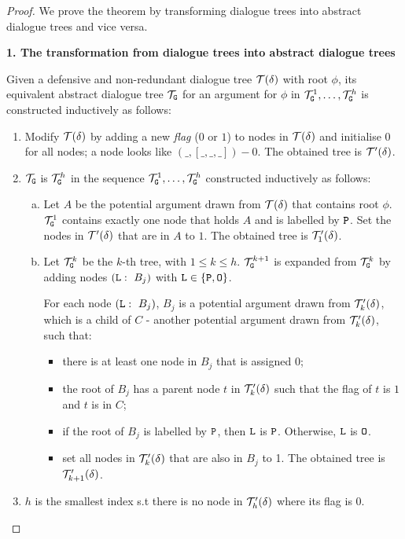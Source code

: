 \begin{proof}
We prove the theorem by transforming dialogue trees into abstract dialogue trees and vice versa.

\textbf{1. The transformation from dialogue trees into abstract dialogue trees}

Given a defensive and non-redundant dialogue tree $\mathcal{T}(\delta)$ with root $\phi$, its equivalent abstract dialogue tree $\mathcal{T}_{\texttt{\textup{G}}}$ for an argument for $\phi$ in $\mathcal{T}_{\texttt{\textup{G}}}^{1}, \ldots, \mathcal{T}_{\texttt{\textup{G}}}^{h}$ is constructed inductively as follows:

\begin{enumerate}
    \item Modify $\mathcal{T}(\delta)$ by adding a new \emph{flag} ($0$ or $1$) to  nodes in $\mathcal{T}(\delta)$ and initialise $0$ for all nodes; a node looks like $(\_, [\_, \_, \_])-0$. The obtained tree is $\mathcal{T}^{\prime}(\delta)$.

    \item $\mathcal{T}_{\texttt{\textup{G}}}$ is $\mathcal{T}_{\texttt{\textup{G}}}^{h}$ in the sequence $\mathcal{T}_{\texttt{\textup{G}}}^{1}, \ldots, \mathcal{T}_{\texttt{\textup{G}}}^{h}$ constructed inductively as follows:
    \begin{enumerate} [a)] %
    
    \item Let $A$ be the potential argument drawn from $\mathcal{T}(\delta)$ that contains root $\phi$. $\mathcal{T}_{\texttt{\textup{G}}}^{1}$ contains exactly one node that holds $A$ and is labelled by $\texttt{\textup{P}}$. Set the nodes in $\mathcal{T}^{\prime}(\delta)$ that are in $A$ to $1$. The obtained tree is $\mathcal{T}^{\prime}_{1}(\delta)$.


    \item Let $\mathcal{T}_{\texttt{\textup{G}}}^{k}$ be the $k$-th tree, with $1 \leq k \leq h$. $\mathcal{T}^{k+1}_{\texttt{\textup{G}}}$ is expanded from $\mathcal{T}^{k}_{\texttt{\textup{G}}}$ by adding nodes $(\texttt{\textup{L}} :\ B_j)$ with $\texttt{\textup{L}} \in \{\texttt{\textup{P}}, \texttt{\textup{O}}\}$.
    
    For each node $(\texttt{\textup{L}} :\ B_j)$, $B_j$ is a potential argument drawn from $\mathcal{T}^{\prime}_{k}(\delta)$, which is a child of $C$ - another potential argument drawn from $\mathcal{T}^{\prime}_{k}(\delta)$, such that:

    \begin{itemize}
        \item there is at least one node in $B_j$ that is assigned $0$;
        \item the root of $B_j$ has a parent node $t$ in $\mathcal{T}^{\prime}_{k}(\delta)$ such that the flag of $t$  is $1$ and $t$ is in $C$;
        \item if the root of $B_j$ is labelled by $\texttt{\textup{P}}$, then $\texttt{\textup{L}}$ is $\texttt{\textup{P}}$. Otherwise, $\texttt{\textup{L}}$ is $\texttt{\textup{O}}$.
        \item set all nodes in $\mathcal{T}^{\prime}_{k}(\delta)$ that are also in $B_j$ to 1. The obtained tree is $\mathcal{T}^{\prime}_{k+1}(\delta)$.
    \end{itemize}
    \end{enumerate}
    \item $h$ is the smallest index s.t there is no node in $\mathcal{T}^{\prime}_{h}(\delta)$ where its flag is $0$.
\end{enumerate}


\end{proof}
